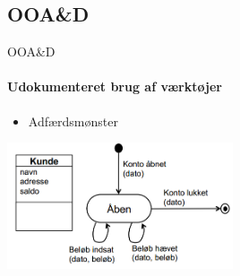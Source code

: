 \subsection{OOA\&D}
\begin{frame}{OOA\&D}
	\framesubtitle{Udokumenteret brug af værktøjer}
	\begin{itemize} 
	    \item Adfærdsmønster
	\end{itemize}
\vspace{4 mm}
\includegraphics[width=0.5\textwidth]{images/adfaersmoenster.PNG}
\end{frame}